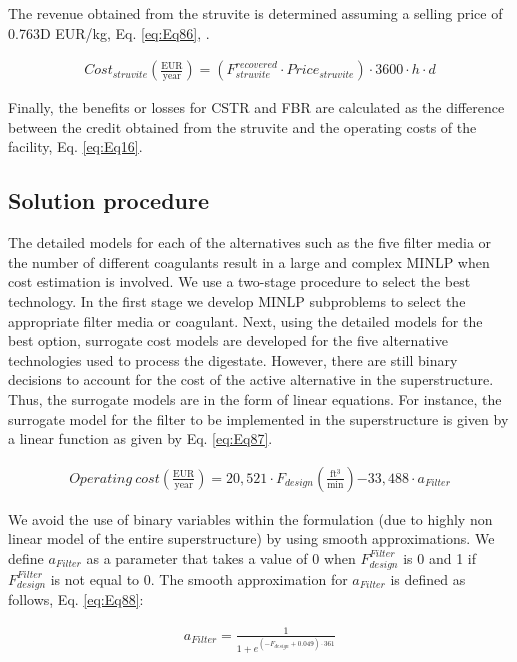 \begin{refsection}[referencesCh2]
The revenue obtained from the struvite is determined assuming a selling price of 0.763D EUR/kg, Eq. \ref{eq:Eq86}, \citep{molinos2011economic}.

\begin{align}
	Cost_{struvite} \left( \frac{\text{EUR}}{\text{year}} \right) = \left( F_{struvite}^{recovered}\cdot{Price}_{struvite} \right) \cdot 3600\cdot h \cdot d \label{eq:Eq86}
\end{align}

Finally, the benefits or losses for CSTR and FBR are calculated as the difference between the credit obtained from the struvite and the operating costs of the facility, Eq. \ref{eq:Eq16}.


\subsection{Solution procedure} \label{section:SolutionProcedure}
The detailed models for each of the alternatives such as the five filter media or the number of different coagulants result in a large and complex MINLP when cost estimation is involved. We use a two-stage procedure to select the best technology. In the first stage we develop MINLP subproblems to select the appropriate filter media or coagulant. Next, using the detailed models for the best option, surrogate cost models are developed for the five alternative technologies used to process the digestate. However, there are still binary decisions to account for the cost of the active alternative in the superstructure. Thus, the surrogate models are in the form of linear equations. For instance, the surrogate model for the filter to be implemented in the superstructure is given by a linear function as given by Eq. \ref{eq:Eq87}.

\begin{align}
	{Operating \ cost} \left( \frac{\text{EUR}}{\text{year}} \right) = 20,521 \cdot F_{design} \left( \frac{\text{ft}{^3}}{\text{min}} \right) { -33,488} \cdot {a}_{Filter} \label{eq:Eq87}
\end{align}

We avoid the use of binary variables within the formulation (due to highly non linear model of the entire superstructure) by using smooth approximations. We define $a_{Filter}$ as a parameter that takes a value of 0 when $F_{design}^{Filter}$ is 0 and 1 if $F_{design}^{Filter}$ is not equal to 0. The smooth approximation for $a_{Filter}$ is defined as follows, Eq. \ref{eq:Eq88}:

\begin{align}
	a_{Filter} = \frac{1}{1 + {e^{\left( -{F_{design}} + {0.049} \right) \cdot 361}}} \label{eq:Eq88}
\end{align}


\end{refsection}
